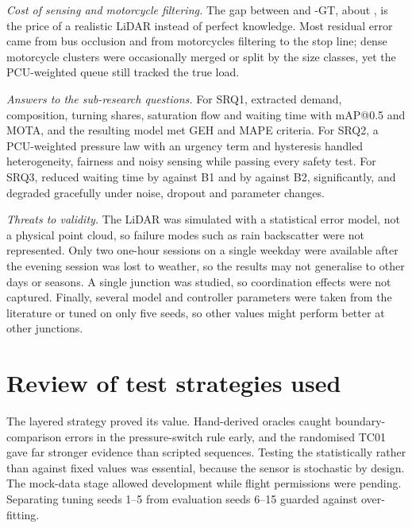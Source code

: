\textit{Cost of sensing and motorcycle filtering.} The gap between \prism{} and \prism{}-GT, about , is the price of a realistic LiDAR instead of perfect knowledge. Most residual error came from bus occlusion and from motorcycles filtering to the stop line; dense motorcycle clusters were occasionally merged or split by the size classes, yet the PCU-weighted queue still tracked the true load.

\textit{Answers to the sub-research questions.} For SRQ1, \dtx{} extracted demand, composition, turning shares, saturation flow and waiting time with  mAP@0.5 and  MOTA, and the resulting model met GEH and MAPE criteria. For SRQ2, a PCU-weighted pressure law with an urgency term and hysteresis handled heterogeneity, fairness and noisy sensing while passing every safety test. For SRQ3, \prism{} reduced waiting time by  against B1 and by  against B2, significantly, and degraded gracefully under noise, dropout and parameter changes.

\textit{Threats to validity.}\label{sec:eval-threats} The LiDAR was simulated with a statistical error model, not a physical point cloud, so failure modes such as rain backscatter were not represented. Only two one-hour sessions on a single weekday were available after the evening session was lost to weather, so the results may not generalise to other days or seasons. A single junction was studied, so coordination effects were not captured. Finally, several model and controller parameters were taken from the literature or tuned on only five seeds, so other values might perform better at other junctions.

\section{Review of test strategies used}\label{sec:eval-review}

The layered strategy proved its value. Hand-derived oracles caught boundary-comparison errors in the pressure-switch rule early, and the randomised TC01 gave far stronger evidence than scripted sequences. Testing the \vls{} statistically rather than against fixed values was essential, because the sensor is stochastic by design. The mock-data stage allowed development while flight permissions were pending. Separating tuning seeds 1--5 from evaluation seeds 6--15 guarded against over-fitting.

